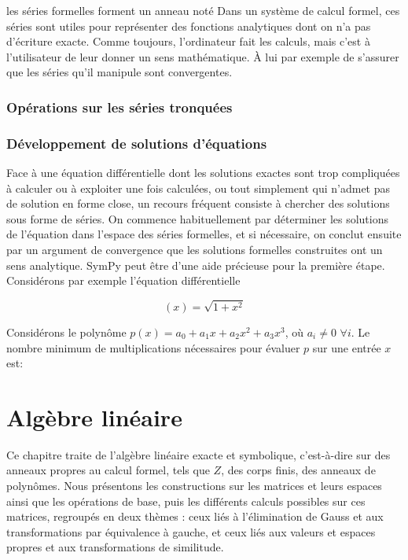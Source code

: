 les séries formelles forment un anneau noté Dans un système de calcul formel, ces séries sont utiles pour représenter des fonctions analytiques dont on n'a pas d’écriture exacte. Comme toujours, l’ordinateur fait les calculs, mais c’est à l'utilisateur de leur donner un sens mathématique. À lui par exemple de s’assurer que les séries qu’il manipule sont convergentes. 
 \subsection{Opérations sur les séries tronquées}
 \subsection{Développement de solutions d’équations}
 Face à une équation différentielle dont les solutions exactes sont trop compliquées à calculer ou à exploiter une fois calculées, ou tout simplement qui n’admet pas de solution en forme close, un recours fréquent consiste à chercher des solutions sous forme de séries. On commence habituellement par déterminer les solutions 
de l’équation dans l’espace des séries formelles, et si nécessaire, on conclut ensuite par un argument de convergence que les solutions formelles construites ont un sens analytique. SymPy peut être d’une aide précieuse pour la première étape. Considérons par exemple l’équation différentielle

\begin{example}
\[
 \left(x\right) = \sqrt{1+x^{2}}
\]
\end{example}

\begin{exercise}
Considérons le polynôme $p(x) = a_{0} + a_{1} x + a_{2} x^{2} + a_{3} x^{3}$, où $a_{i} \neq 0$ $\forall i$. Le nombre minimum de multiplications nécessaires pour évaluer $p$ sur une entrée $x$ est:
\end{exercise}
\chapter{Algèbre linéaire}
Ce chapitre traite de l’algèbre linéaire exacte et symbolique, c’est-à-dire sur
des anneaux propres au calcul formel, tels que $Z$, des corps finis, des anneaux de
polynômes. Nous présentons les constructions sur les matrices et leurs espaces ainsi que les
opérations de base, puis les différents calculs possibles sur ces matrices, regroupés en deux thèmes : ceux liés à l’élimination de Gauss et aux transformations par équivalence à gauche, et ceux liés aux valeurs et espaces
propres et aux transformations de similitude.
